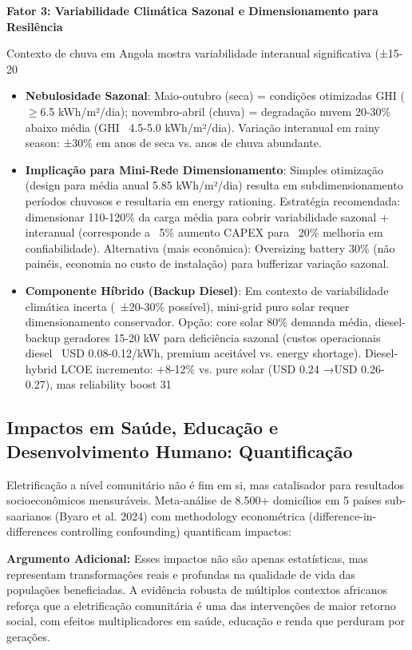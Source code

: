 \documentclass[12pt, a4paper]{article}
\begin{document}
\textbf{Fator 3: Variabilidade Climática Sazonal e Dimensionamento para Resilência}

Contexto de chuva em Angola mostra variabilidade interanual significativa (±15-20%

\begin{itemize}
\item \textbf{Nebulosidade Sazonal}: Maio-outubro (seca) = condições otimizadas GHI ($\geq$6.5 kWh/m²/dia); novembro-abril (chuva) = degradação nuvem 20-30\% abaixo média (GHI ~4.5-5.0 kWh/m²/dia). Variação interanual em rainy season: ±30\% em anos de seca vs. anos de chuva abundante.
\item \textbf{Implicação para Mini-Rede Dimensionamento}: Simples otimização (design para média anual 5.85 kWh/m²/dia) resulta em subdimensionamento períodos chuvosos e resultaria em energy rationing. Estratégia recomendada: dimensionar 110-120\% da carga média para cobrir variabilidade sazonal + interanual (corresponde a ~5\% aumento CAPEX para ~20\% melhoria em confiabilidade). Alternativa (mais econômica): Oversizing battery 30\% (não painéis, economia no custo de instalação) para bufferizar variação sazonal.
\item \textbf{Componente Híbrido (Backup Diesel)}: Em contexto de variabilidade climática incerta (~±20-30\% possível), mini-grid puro solar requer dimensionamento conservador. Opção: core solar 80\% demanda média, diesel-backup geradores 15-20 kW para deficiência sazonal (custos operacionais diesel ~USD 0.08-0.12/kWh, premium aceitável vs. energy shortage). Diesel-hybrid LCOE incremento: +8-12\% vs. pure solar (USD 0.24 →USD 0.26-0.27), mas reliability boost 31%
\end{itemize}

\subsection{Impactos em Saúde, Educação e Desenvolvimento Humano: Quantificação}

Eletrificação a nível comunitário não é fim em si, mas catalisador para resultados socioeconômicos mensuráveis. Meta-análise de 8.500+ domicílios em 5 países sub-saarianos (Byaro et al. 2024) com methodology econométrica (difference-in-differences controlling confounding) quantificam impactos:

\textbf{Argumento Adicional:} Esses impactos não são apenas estatísticas, mas representam transformações reais e profundas na qualidade de vida das populações beneficiadas. A evidência robusta de múltiplos contextos africanos reforça que a eletrificação comunitária é uma das intervenções de maior retorno social, com efeitos multiplicadores em saúde, educação e renda que perduram por gerações.
\end{document}
